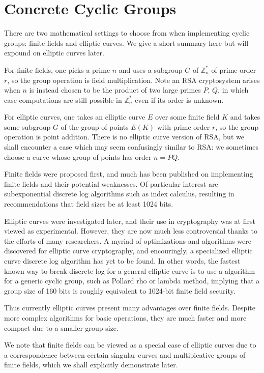 \section{Concrete Cyclic Groups}

There are two mathematical settings to choose from
when implementing cyclic groups: finite fields and elliptic curves.
We give a short summary here but will expound on elliptic curves later.

For finite fields, one picks a prime $n$ and uses
a subgroup $G$ of $\mathbb{Z}_n^*$
of prime order $r$, so the group operation is field multiplication.
Note an RSA cryptosystem arises when $n$ is instead chosen to be the
product of two
large primes $P$, $Q$, in which case computations are still possible
in $\mathbb{Z}_n^*$ even if its order is unknown.

For elliptic curves, one takes an elliptic curve $E$ over some
finite field $K$ and takes some subgroup $G$ of the group of points
$E(K)$ with prime order $r$, so the group operation is point addition.
There is no elliptic curve version of RSA, but we shall encounter
a case which may seem confusingly similar to RSA: we sometimes choose
a curve whose group of points has order $n = PQ$.

Finite fields were proposed first, and much has been published
on implementing finite fields and their potential weaknesses.
Of particular interest are subexponential discrete log
algorithms such as index calculus, resulting in recommendations that
field sizes be at least 1024 bits.

Elliptic curves were investigated later, and their use in cryptography
was at first viewed as experimental. However, they are now much less
controversial thanks to the efforts of many researchers. A myriad
of optimizations
and algorithms were discovered for elliptic curve cryptography,
and encouringly, a specialized elliptic curve discrete log algorithm
has yet to be found. In other words, the fastest known way to break discrete log
for a general elliptic curve is to use a algorithm for a generic
cyclic group, such as Pollard rho or lambda method, implying that a group
size of 160 bits is roughly equivalent to 1024-bit finite field security.

Thus currently elliptic curves present many advantages over finite fields.
Despite more complex algorithms for basic operations, they are much faster
and more compact due to a smaller group size.

We note that finite fields can be viewed as a special case of elliptic
curves due to a correspondence between certain singular curves and
multipicative groups of finite fields, which we shall explicitly demonstrate
later.

